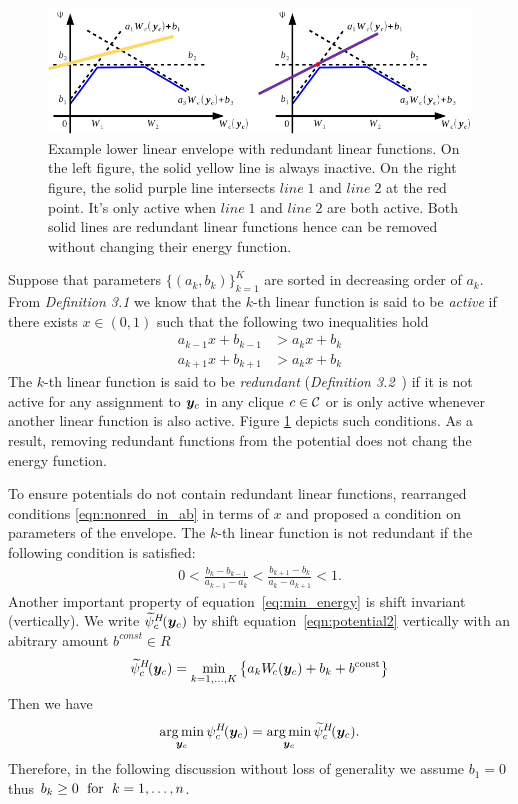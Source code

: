 \begin{figure}[ht]
  \centering
  \includegraphics[width=1\columnwidth]{Methodology/figures/redundant}
  \caption{\label{fig:redundant} Example lower linear envelope
    with redundant linear functions. On the left figure, the
    solid yellow line is always inactive. On the right figure,
    the solid purple line intersects $line \; 1$ and $line \; 2$
    at the red point. It's only active when $line \; 1$ and $line
    \; 2$ are both active. Both solid lines are redundant linear
    functions hence can be removed without changing their energy
    function.}
\end{figure}
%
Suppose that parameters $\{(a_k, b_k)\}_{k=1}^K$ are sorted in
decreasing order of $a_k$. From \emph{Definition 3.1}
\cite{gouldlearning} we know that the $k$-th linear function is
said to be \emph{active} if there exists $x \in (0, 1)$ such that
the following two inequalities hold
\begin{align}
  a_{k-1} x + b_{k-1} &> a_k x + b_k \nonumber \\
  a_{k+1} x + b_{k+1} &> a_k x + b_k
  \label{eqn:nonred_in_ab}
\end{align}
%
The $k$-th linear function is said to be \emph{redundant}
(\emph{Definition 3.2}~\cite{gouldlearning}) if it is not active
for any assignment to ${\bm{y}}_c$ in any clique $c \in {\mathcal{C}}$ or is only
active whenever another linear function is also active.
Figure \ref{fig:redundant} depicts such conditions. As a
result, removing redundant functions from the potential does not
chang the energy function.

To ensure potentials do not contain redundant linear functions,
 rearranged conditions
\ref{eqn:nonred_in_ab} in terms of $x$ and proposed a condition on
parameters of the envelope. The $k$-th linear function is
not redundant if the following condition is satisfied:
%
\begin{align}
    0
    <
    \frac{b_k - b_{k-1}}{a_{k-1} - a_k}
    <
    \frac{b_{k+1} - b_k}{a_k - a_{k+1}}
    <
    1.
  \label{eq:nonredundant}
\end{align}
%
Another important property of equation~\eqref{eq:min_energy} is
shift invariant~\cite{gouldlearning} (vertically). We write
$\widetilde{\psi}^{H}_c\!({\bm{y}}_c)$ by shift equation~\eqref{eqn:potential2} vertically
with an abitrary amount $b^{const}\in R$
$$\widetilde{\psi}^{H}_c\!({\bm{y}}_c) = \min_{k=1, \ldots, K}
\left\{a_k W_{\!c}({\bm{y}}_c) + b_k + b^\textrm{const} \right\}$$
%
Then we have
\begin{align}
  \operatorname*{arg\,min}_{{\bm{y}}_c} \psi^H_c\!({\bm{y}}_c)
  = \operatorname*{arg\,min}_{{\bm{y}}_c} \widetilde{\psi}^{H}_c\!({\bm{y}}_c).
  \label{eq:shift_invariant}
\end{align}
%
Therefore, in the following discussion without loss of generality
we assume $b_1 = 0$ thus $b_k\geq0 \text{\; for \;} k=1,\dots,n$.
%
